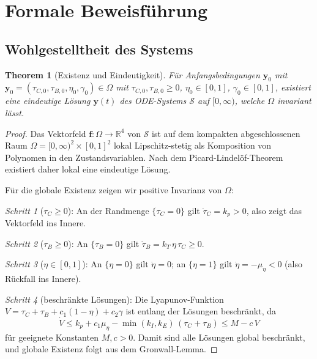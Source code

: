 ﻿\documentclass[12pt,a4paper]{article}
\newtheorem{theorem}{Theorem}[section]
\theoremstyle{definition}
\newcommand{\R}{\mathbb{R}}
\begin{document}
	\section{Formale Beweisführung}
	
	\subsection{Wohlgestelltheit des Systems}
	
	\begin{theorem}[Existenz und Eindeutigkeit]
		\label{thm:existence}
		Für Anfangsbedingungen $\mathbf{y}_0$ mit $\mathbf{y}_0 = (\tau_{C,0}, \tau_{B,0}, \eta_0, \gamma_0) \in \Omega$ mit $\tau_{C,0}, \tau_{B,0} \geq 0$, $\eta_0 \in [0,1]$, $\gamma_0 \in [0,1]$, existiert eine eindeutige Lösung $\mathbf{y}(t)$ des ODE-Systems $\mathcal{S}$ auf $[0, \infty)$, welche $\Omega$ invariant lässt.
	\end{theorem}
	
	\begin{proof}
		Das Vektorfeld $\mathbf{f}: \Omega \to \R^4$ von $\mathcal{S}$ ist auf dem kompakten abgeschlossenen Raum $\Omega = [0,\infty)^2 \times [0,1]^2$ lokal Lipschitz-stetig als Komposition von Polynomen in den Zustandsvariablen. Nach dem Picard-Lindelöf-Theorem existiert daher lokal eine eindeutige Lösung.
		
		Für die globale Existenz zeigen wir positive Invarianz von $\Omega$:
		
		\emph{Schritt 1} ($\tau_C \geq 0$): An der Randmenge $\{\tau_C = 0\}$ gilt $\dot{\tau}_C = k_p > 0$, also zeigt das Vektorfeld ins Innere. \checkmark
		
		\emph{Schritt 2} ($\tau_B \geq 0$): An $\{\tau_B = 0\}$ gilt $\dot{\tau}_B = k_T\,\eta\,\tau_C \geq 0$. \checkmark
		
		\emph{Schritt 3} ($\eta \in [0,1]$): An $\{\eta = 0\}$ gilt $\dot{\eta} = 0$; an $\{\eta = 1\}$ gilt $\dot{\eta} = -\mu_\eta < 0$ (also Rückfall ins Innere). \checkmark
		
		\emph{Schritt 4} (beschränkte Lösungen): Die Lyapunov-Funktion $V = \tau_C + \tau_B + c_1(1-\eta) + c_2\gamma$ ist entlang der Lösungen beschränkt, da
		\[
		\dot{V} \leq k_p + c_1\mu_\eta - \min(k_I, k_E)\,(\tau_C + \tau_B) \leq M - c\,V
		\]
		für geeignete Konstanten $M, c > 0$. Damit sind alle Lösungen global beschränkt, und globale Existenz folgt aus dem Gronwall-Lemma.
	\end{proof}
	
\end{document}
